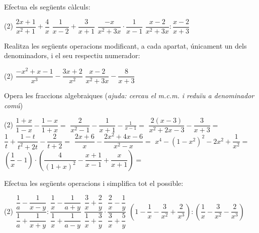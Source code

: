 \begin{mylist}

		\exer  Efectua els següents càlculs: 
	\begin{tasks}(2)
	\task $\dfrac{2x+1}{x^{2} +1} +\dfrac{4}{x} $ 
	 \task $\dfrac{1}{x-2} +\dfrac{3}{x+1} $  
	  \task $\dfrac{-x}{x^{2} +3x} \cdot \dfrac{1}{x-1} $ 
	   \task $\dfrac{x-2}{x^{2} +3x} :\dfrac{x-2}{x+3} $
\end{tasks}


		\exer  Realitza les següents operacions modificant, a cada apartat, únicament un dels denominadors, i el seu respectiu numerador: 
	\begin{tasks}(2)
		\task $\dfrac{-x^{2} +x-1}{x^{3} } -\dfrac{3x+2}{x^{2} } $  
		 \task $\dfrac{x-2}{x^{2} +3x} -\dfrac{8}{x+3} $
	\end{tasks}

\exer[1] Opera les fraccions algebraiques (\textit{ajuda: cercau el m.c.m. i redu\"{i}u a denominador com\'{u}})
\begin{tasks}(2)
	\task  $\dfrac{1+x}{1-x} -\dfrac{1-x}{1+x} =$   
	\task   $\dfrac{2}{x^{2} -1} -\dfrac{1}{x+1} -\frac{1}{x-1} =$ 
	\task $\dfrac{2(x-3)}{x^{2} +2x-3} -\dfrac{3}{x+3} =$  
	\task   $\dfrac{1}{t} +\dfrac{1-t}{t^{2} +2t} -\dfrac{2}{t+2} =$
	\task  $\dfrac{2x+6}{x} -\dfrac{2x^{2} +4x-6}{x^{2} -x} =$      
	\task   $x^{4} -(1-x^{2} )^{2} -2x^{2} +\dfrac{1}{x^{2} } =$
	\task  $\left(\dfrac{1}{x} -1\right)\cdot \left(\dfrac{4}{\left(1+x\right)^{2} } -\dfrac{x+1}{x-1} +\dfrac{x}{x+1} \right)=$  
\end{tasks}

\exer  Efectua les següents operacions i simplifica tot el possible:
\begin{tasks}(2)
	\task $\dfrac{\dfrac{1}{a} -\dfrac{1}{x-y} }{\dfrac{1}{a} +\dfrac{1}{x+y} } :\dfrac{\dfrac{1}{x} -\dfrac{1}{a+y} }{\dfrac{1}{x} +\dfrac{1}{a-y} } $ 
		\task $\dfrac{\dfrac{3}{x} +\dfrac{2}{y} }{\dfrac{1}{x} +\dfrac{3}{y} } \cdot \dfrac{\dfrac{2}{x} -\dfrac{1}{y} }{\dfrac{3}{x} +\dfrac{5}{y} } $ 
	\task* $\left(1-\dfrac{1}{x} -\dfrac{3}{x^{2} } +\dfrac{2}{x^{3} } \right):\left(\dfrac{1}{x} -\dfrac{3}{x^{2} } -\dfrac{2}{x^{3} } \right)$  
\end{tasks}

\end{mylist}



